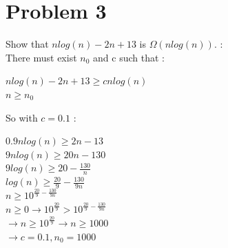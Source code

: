 \documentclass{report}
\newcommand\tab[1][1cm]{\hspace*{#1}}
\begin{document}
    \section*{\huge Problem 3}
        Show that $nlog(n) - 2n + 13$  is $\Omega(nlog(n)).$ : \\
        \tab There must exist $n_0$ and c such that :
        \begin{center}
            \large $nlog(n) - 2n + 13 \geq cnlog(n)$\\
            \large $n \geq n_0$
        \end{center}
        \tab So with $c = 0.1$ :
        \begin{center}
            $0.9nlog(n) \geq 2n -13$\\
            $9nlog(n) \geq 20n -130$\\
            $9log(n) \geq 20 - \frac{130}{n}$\\
            $log(n) \geq \frac{20}{9} - \frac{130}{9n}$\\
            $n \geq 10^{\frac{20}{9} - \frac{130}{9n}}$\\
            $n \geq 0 \rightarrow 10 ^ {\frac{20}{9}} > 10 ^{\frac{20}{9} - \frac{130}{9n}}$\\
            $\rightarrow n \geq 10 ^ {\frac{20}{9}} \rightarrow n \geq 1000$ \\
            \huge $\rightarrow c = 0.1, n_0 = 1000$
        \end{center}
\end{document}
